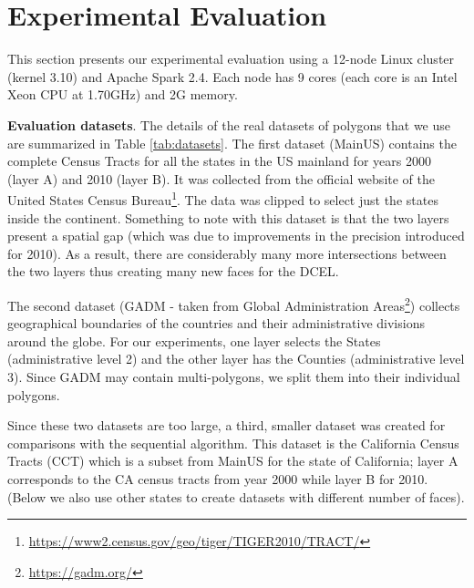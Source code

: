\section{Experimental Evaluation} \label{sec:experiments}

This section presents our experimental evaluation using a 12-node Linux cluster (kernel 3.10) and Apache Spark 2.4. Each node has 9 cores (each core is an Intel Xeon CPU at 1.70GHz) and 2G memory.

\textbf{Evaluation datasets}.
The details of the real datasets of polygons that we use are summarized in Table \ref{tab:datasets}. The first dataset (MainUS) contains the complete Census Tracts for all the states in the US mainland for years 2000 (layer A) and 2010 (layer B). 
It was collected from the official website of the United States Census Bureau\footnote{\url{https://www2.census.gov/geo/tiger/TIGER2010/TRACT/}}.  
The data was clipped to select just the states inside the continent. 
Something to note with this dataset is that the two layers  present a spatial gap (which was due to improvements in the precision introduced for 2010). As a result, there are considerably many more intersections between the two layers thus creating many new faces for the DCEL.

The second dataset (GADM - taken from Global Administration Areas\footnote{\url{https://gadm.org/}}) collects geographical boundaries of the countries and their administrative divisions around the globe.  
For our experiments, one layer selects the States (administrative level 2) and the other layer has the Counties (administrative  level 3).  
Since GADM may contain multi-polygons, we split them into their individual polygons. 

Since these two datasets are too large, a third, smaller dataset was created for comparisons with the sequential algorithm. This dataset is
the California Census Tracts (CCT) which is a subset from MainUS for the state of California; layer A corresponds to the CA census tracts from year 2000 while layer B for 2010. (Below we also use other states to create datasets with different number of faces).



